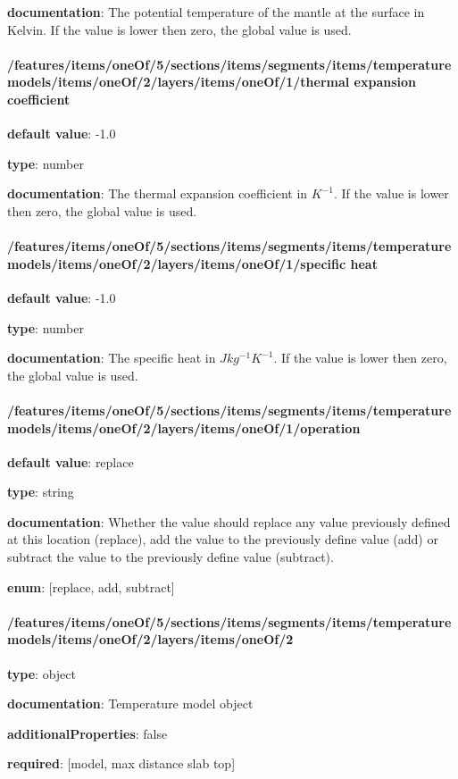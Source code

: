 \begin{itemized}
\item {\bf documentation}: The potential temperature of the mantle at the surface in Kelvin. If the value is lower then zero, the global value is used.
\end{itemized}\paragraph{/features/items/oneOf/5/sections/items/segments/items/temperature models/items/oneOf/2/layers/items/oneOf/1/thermal expansion coefficient} \begin{itemized}
\item {\bf default value}: -1.0
\item {\bf type}: number
\item {\bf documentation}: The thermal expansion coefficient in $K^{-1}$. If the value is lower then zero, the global value is used.
\end{itemized}\paragraph{/features/items/oneOf/5/sections/items/segments/items/temperature models/items/oneOf/2/layers/items/oneOf/1/specific heat} \begin{itemized}
\item {\bf default value}: -1.0
\item {\bf type}: number
\item {\bf documentation}: The specific heat in $J kg^{-1} K^{-1}$. If the value is lower then zero, the global value is used.
\end{itemized}\paragraph{/features/items/oneOf/5/sections/items/segments/items/temperature models/items/oneOf/2/layers/items/oneOf/1/operation} \begin{itemized}
\item {\bf default value}: replace
\item {\bf type}: string
\item {\bf documentation}: Whether the value should replace any value previously defined at this location (replace), add the value to the previously define value (add) or subtract the value to the previously define value (subtract).
\item {\bf enum}: [replace, add, subtract]\end{itemized}\paragraph{/features/items/oneOf/5/sections/items/segments/items/temperature models/items/oneOf/2/layers/items/oneOf/2} \begin{itemized}
\item {\bf type}: object
\item {\bf documentation}: Temperature model object
\item {\bf additionalProperties}: false
\item {\bf required}: [model, max distance slab top]\end{itemized}
